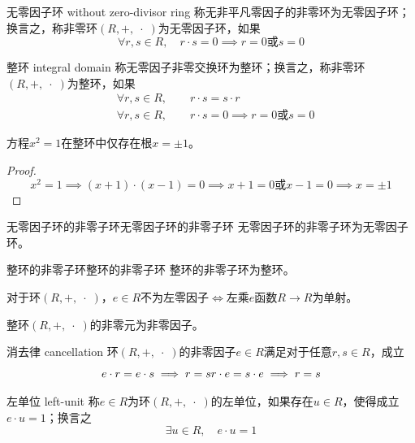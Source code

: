 \begin{definition}{无零因子环 without zero-divisor ring}
	称无非平凡零因子的非零环为无零因子环；换言之，称非零环$(R,+,\;\cdot\;)$为无零因子环，如果
	$$
	\forall r,s\in R,\quad r\cdot s=0\implies r=0\text{或}s=0
	$$
\end{definition}

\begin{definition}{整环 integral domain}
	称无零因子非零交换环为整环；换言之，称非零环$(R,+,\;\cdot\;)$为整环，如果
	\begin{align*}
		&\forall r,s\in R,\qquad r\cdot s=s\cdot r\\
		&\forall r,s\in R,\qquad r\cdot s=0\implies r=0\text{或}s=0
	\end{align*}
\end{definition}

\begin{problem}
	方程$x^2=1$在整环中仅存在根$x=\pm 1$。
\end{problem}

\begin{proof}
	$$
	x^2=1\implies (x+1)\cdot(x-1)=0\implies x+1=0\text{或}x-1=0\implies x=\pm 1
	$$
\end{proof}

\begin{proposition}{无零因子环的非零子环}{无零因子环的非零子环}
	无零因子环的非零子环为无零因子环。
\end{proposition}

\begin{proposition}{整环的非零子环}{整环的非零子环}
	整环的非零子环为整环。
\end{proposition}

\begin{proposition}
	对于环$(R,+,\;\cdot\;)$，$e\in R$不为左零因子$\iff$左乘$e$函数$R\to R$为单射。
\end{proposition}

\begin{proposition}
	整环$(R,+,\;\cdot\;)$的非零元为非零因子。
\end{proposition}

\begin{proposition}{消去律 cancellation}
	环$(R,+,\;\cdot\;)$的非零因子$e\in R$满足对于任意$r,s\in R$，成立
	$$
	e\cdot r=e\cdot s\implies r=s\\
	r\cdot e=s\cdot e\implies r=s
	$$
\end{proposition}

\begin{definition}{左单位 left-unit}
	称$e\in R$为环$(R,+,\;\cdot\;)$的左单位，如果存在$u\in R$，使得成立$e\cdot u=1$；换言之
	$$
	\exists u\in R,\quad e\cdot u=1
	$$
\end{definition}


